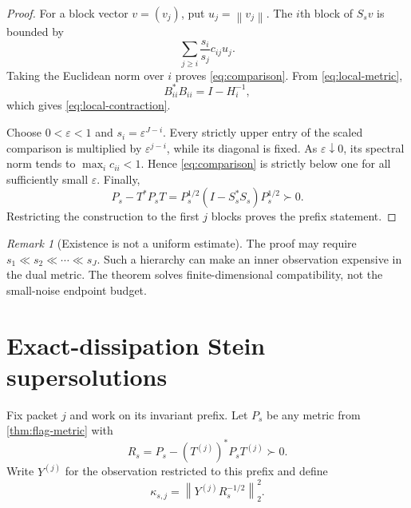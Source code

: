 \documentclass[11pt]{article}
\theoremstyle{remark}
\newtheorem{remark}[theorem]{Remark}
\newcommand{\norm}[1]{\left\lVert#1\right\rVert}
\begin{document}
\begin{proof}
For a block vector $v=(v_j)$, put $u_j=\norm{v_j}$.  The $i$th block of
$S_sv$ is bounded by
\[
 \sum_{j\ge i}\frac{s_i}{s_j}c_{ij}u_j.
\]
Taking the Euclidean norm over $i$ proves \eqref{eq:comparison}.  From
\eqref{eq:local-metric},
\[
 B_{ii}^*B_{ii}
 =I-H_i^{-1},
\]
which gives \eqref{eq:local-contraction}.

Choose $0<\varepsilon<1$ and $s_i=\varepsilon^{J-i}$.  Every strictly
upper entry of the scaled comparison is multiplied by
$\varepsilon^{j-i}$, while its diagonal is fixed.  As
$\varepsilon\downarrow0$, its spectral norm tends to
$\max_i c_{ii}<1$.  Hence \eqref{eq:comparison} is strictly below one for
all sufficiently small $\varepsilon$.  Finally,
\[
 P_s-T^*P_sT
 =P_s^{1/2}(I-S_s^*S_s)P_s^{1/2}\succ0.
\]
Restricting the construction to the first $j$ blocks proves the prefix
statement.
\end{proof}

\begin{remark}[Existence is not a uniform estimate]
The proof may require $s_1\ll s_2\ll\cdots\ll s_J$.  Such a hierarchy can
make an inner observation expensive in the dual metric.  The theorem solves
finite-dimensional compatibility, not the small-noise endpoint budget.
\end{remark}

\section{Exact-dissipation Stein supersolutions}
\label{sec:supersolution}

Fix packet $j$ and work on its invariant prefix.  Let $P_s$ be any metric
from \cref{thm:flag-metric} with
\begin{equation}
 R_s=P_s-(T^{(j)})^*P_sT^{(j)}\succ0.
 \label{eq:dissipation}
\end{equation}
Write $Y^{(j)}$ for the observation restricted to this prefix and define
\begin{equation}
 \kappa_{s,j}=\norm{Y^{(j)}R_s^{-1/2}}_2^2.
 \label{eq:kappa}
\end{equation}
\end{document}
